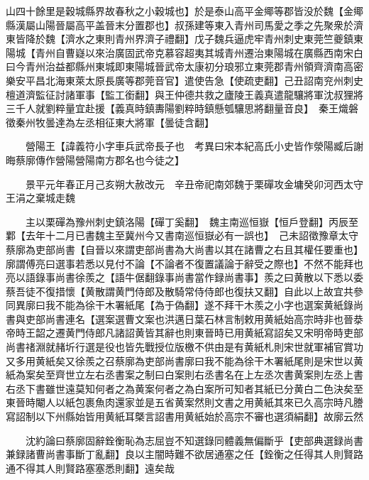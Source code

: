 山四十餘里是穀城縣界故春秋之小穀城也】於是泰山高平金鄊等郡皆没於魏【金鄊縣漢屬山陽晉屬高平盖晉末分置郡也】叔孫建等東入青州司馬愛之季之先聚衆於濟東皆降於魏【濟水之東則青州界濟子禮翻】戊子魏兵逼虎牢青州刺史東莞竺夔鎮東陽城【青州自曹嶷以來治廣固武帝克慕容超夷其城青州遷治東陽城在廣縣西南宋白曰今青州治益都縣州東城即東陽城晉武帝太康初分琅邪立東莞郡青州領齊濟南高密樂安平昌北海東萊太原長廣等郡莞音官】遣使告急【使疏吏翻】己丑詔南兖州刺史檀道濟監征討諸軍事【監工銜翻】與王仲德共救之廬陵王義真遣龍驤將軍沈叔狸將三千人就劉粹量宜赴援【義真時鎮夀陽劉粹時鎮懸瓠驤思將翻量音良】　秦王熾磐徵秦州牧曇達為左丞相征東大將軍【曇徒含翻】

　　營陽王【諱義符小字車兵武帝長子也　考異曰宋本紀高氏小史皆作滎陽臧后謝晦蔡廓傳作營陽營陽南方郡名也今徒之】

　　景平元年春正月己亥朔大赦改元　辛丑帝祀南郊魏于栗磾攻金墉癸卯河西太守王涓之棄城走魏

　　主以栗磾為豫州刺史鎮洛陽【磾丁奚翻】　魏主南巡恒嶽【恒戶登翻】丙辰至鄴【去年十二月已書魏主至冀州今又書南巡恒嶽必有一誤也】　己未詔徵豫章太守蔡廓為吏部尚書【自晉以來謂吏部尚書為大尚書以其在諸曹之右且其權任要重也】廓謂傅亮曰選事若悉以見付不論【不論者不復置議論于辭受之際也】不然不能拜也亮以語錄事尚書徐羨之【語牛倨翻錄事尚書當作録尚書事】羨之曰黄散以下悉以委蔡吾徒不復措懷【黄散謂黄門侍郎及散騎常侍侍郎也復扶又翻】自此以上故宜共參同異廓曰我不能為徐干木署紙尾【為于偽翻】遂不拜干木羨之小字也選案黄紙錄尚書與吏部尚書連名【選案選曹文案也洪邁日葉石林言制敕用黄紙始高宗時非也晉㳟帝時王韶之遷黄門侍郎凡諸詔黄皆其辭也則東晉時已用黄紙寫詔矣又宋明帝時吏部尚書禇淵就赭圻行選是役也皆先戰授位版檄不供由是有黄紙札則宋世就軍補官賞功又多用黄紙矣又徐羨之召蔡廓為吏部尚書廓曰我不能為徐干木署紙尾則是宋世以黄紙為案矣至齊世立左右丞書案之制曰白案則右丞書名在上左丞次書黄案則左丞上書右丞下書雖世遠莫知何者之為黄案何者之為白案所可知者其紙已分黄白二色決矣至東晉時閹人以紙包裹魚肉還家並是五省黄案然則文書之用黄紙其來已久高宗時凡謄寫詔制以下州縣始皆用黄紙耳槩言詔書用黄紙始於高宗不審也選須絹翻】故廓云然

　　沈約論曰蔡廓固辭銓衡恥為志屈豈不知選錄同體義無偏斷乎【吏部典選録尚書兼録諸曹尚書事斷丁亂翻】良以主闇時難不欲居通塞之任【銓衡之任得其人則賢路通不得其人則賢路塞塞悉則翻】遠矣哉

